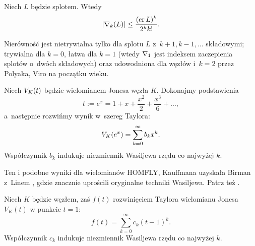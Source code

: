 \begin{conjecture}
    Niech $L$ będzie splotem.
    Wtedy
    \begin{equation}
        |\nabla_k(L)| \le \frac{(\operatorname{cr} L)^k}{2^kk!}.
    \end{equation}
\end{conjecture}

Nierówność jest nietrywialna tylko dla splotu $L$ z~$k+1, k-1, \ldots$ składowymi; trywialna dla $k = 0$, łatwa dla $k=1$ (wtedy $\nabla_1$ jest indeksem zaczepienia splotów o~dwóch składowych) oraz udowodniona dla węzłów i~$k=2$ przez Polyaka, Viro \cite{polyak01} na początku wieku.
%
%

\begin{example}
%
    Niech $V_K(t)$ będzie wielomianem Jonesa węzła $K$.
    Dokonajmy podstawienia
    \begin{equation}
        t := e^x = 1 + x + \frac{x^2}{2} + \frac{x^3}{6} + \ldots,
    \end{equation}
    a~następnie rozwińmy wynik w~szereg Taylora:
    \begin{equation}
        V_K(e^x) = \sum_{k = 0}^\infty b_k x^k.
    \end{equation}
    Współczynnik $b_{k}$ indukuje niezmiennik Wasiljewa rzędu co najwyżej $k$.
\end{example}

Ten i podobne wyniki dla wielomianów HOMFLY, Kauffmana uzyskała Birman z~Linem \cite{birman93}, gdzie znacznie uprościli oryginalne techniki Wasiljewa.
%
%
Patrz też \cite[s. 56]{chmutov12}.
%

\begin{example}
    Niech $K$ będzie węzłem, zaś $f(t)$ rozwinięciem Taylora wielomianu Jonesa $V_K(t)$ w punkcie $t = 1$:
    \begin{equation}
        f(t) = \sum_{k = 0}^\infty c_k (t-1)^k.
    \end{equation}
    Współczynnik $c_{k}$ indukuje niezmiennik Wasiljewa rzędu co najwyżej $k$.
\end{example}

